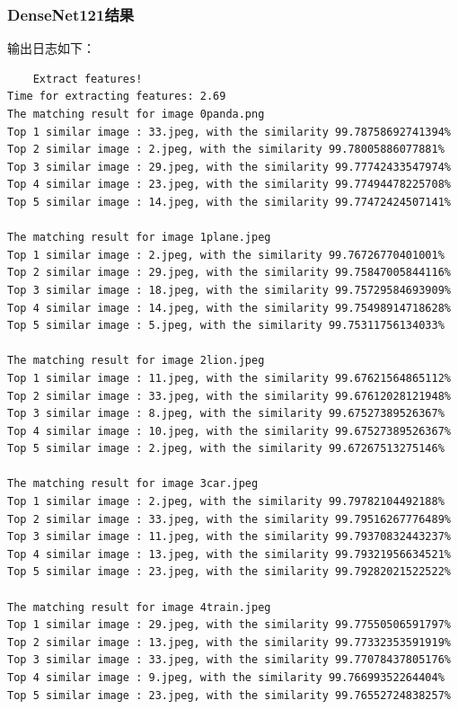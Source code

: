\documentclass{article}
\begin{document}
\newpage

\subsubsection{DenseNet121结果}

    输出日志如下：

\begin{lstlisting}
    Extract features!
Time for extracting features: 2.69
The matching result for image 0panda.png
Top 1 similar image : 33.jpeg, with the similarity 99.78758692741394%
Top 2 similar image : 2.jpeg, with the similarity 99.78005886077881%
Top 3 similar image : 29.jpeg, with the similarity 99.77742433547974%
Top 4 similar image : 23.jpeg, with the similarity 99.77494478225708%
Top 5 similar image : 14.jpeg, with the similarity 99.77472424507141%

The matching result for image 1plane.jpeg
Top 1 similar image : 2.jpeg, with the similarity 99.76726770401001%
Top 2 similar image : 29.jpeg, with the similarity 99.75847005844116%
Top 3 similar image : 18.jpeg, with the similarity 99.75729584693909%
Top 4 similar image : 14.jpeg, with the similarity 99.75498914718628%
Top 5 similar image : 5.jpeg, with the similarity 99.75311756134033%

The matching result for image 2lion.jpeg
Top 1 similar image : 11.jpeg, with the similarity 99.67621564865112%
Top 2 similar image : 33.jpeg, with the similarity 99.67612028121948%
Top 3 similar image : 8.jpeg, with the similarity 99.67527389526367%
Top 4 similar image : 10.jpeg, with the similarity 99.67527389526367%
Top 5 similar image : 2.jpeg, with the similarity 99.67267513275146%

The matching result for image 3car.jpeg
Top 1 similar image : 2.jpeg, with the similarity 99.79782104492188%
Top 2 similar image : 33.jpeg, with the similarity 99.79516267776489%
Top 3 similar image : 11.jpeg, with the similarity 99.79370832443237%
Top 4 similar image : 13.jpeg, with the similarity 99.79321956634521%
Top 5 similar image : 23.jpeg, with the similarity 99.79282021522522%

The matching result for image 4train.jpeg
Top 1 similar image : 29.jpeg, with the similarity 99.77550506591797%
Top 2 similar image : 13.jpeg, with the similarity 99.77332353591919%
Top 3 similar image : 33.jpeg, with the similarity 99.77078437805176%
Top 4 similar image : 9.jpeg, with the similarity 99.76699352264404%
Top 5 similar image : 23.jpeg, with the similarity 99.76552724838257%


\end{lstlisting}
\end{document}
